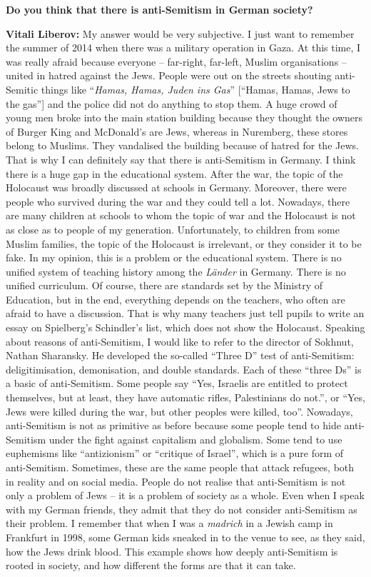 \textbf{Do you think that there is anti-Semitism in German society?} 

\textbf{Vitali Liberov:} My answer would be very subjective. I just want to remember the summer of 2014 when there was a military operation in Gaza. At this time, I was really afraid because everyone – far-right, far-left, Muslim organisations – united in hatred against the Jews. People were out on the streets shouting anti-Semitic things like ``\textit{Hamas, Hamas, Juden ins Gas}'' [``Hamas, Hamas, Jews to the gas''] and the police did not do anything to stop them. A huge crowd of young men broke into the main station building because they thought the owners of Burger King and McDonald’s are Jews, whereas in Nuremberg, these stores belong to Muslims. They vandalised the building because of hatred for the Jews. That is why I can definitely say that there is anti-Semitism in Germany. I think there is a huge gap in the educational system. After the war, the topic of the Holocaust was broadly discussed at schools in Germany. Moreover, there were people who survived during the war and they could tell a lot. Nowadays, there are many children at schools to whom the topic of war and the Holocaust is not as close as to people of my generation. Unfortunately, to children from some Muslim families, the topic of the Holocaust is irrelevant, or they consider it to be fake. In my opinion, this is a problem or the educational system. There is no unified system of teaching history among the \textit{Länder} in Germany. There is no unified curriculum. Of course, there are standards set by the Ministry of Education, but in the end, everything depends on the teachers, who often are afraid to have a discussion. That is why many teachers just tell pupils to write an essay on Spielberg’s Schindler’s list, which does not show the Holocaust. Speaking about reasons of anti-Semitism, I would like to refer to the director of Sokhnut, Nathan Sharansky. He developed the so-called ``Three D'' test of anti-Semitism: deligitimisation, demonisation, and double standards. Each of these ``three Ds'' is a basic of anti-Semitism. Some people say ``Yes, Israelis are entitled to protect themselves, but at least, they have automatic rifles, Palestinians do not.'', or ``Yes, Jews were killed during the war, but other peoples were killed, too''. Nowadays, anti-Semitism is not as primitive as before because some people tend to hide anti-Semitism under the fight against capitalism and globalism. Some tend to use euphemisms like ``antizionism'' or ``critique of Israel'', which is a pure form of anti-Semitism. Sometimes, these are the same people that attack refugees, both in reality and on social media. People do not realise that anti-Semitism is not only a problem of Jews – it is a problem of society as a whole. Even when I speak with my German friends, they admit that they do not consider anti-Semitism as their problem. I remember that when I was a \textit{madrich} in a Jewish camp in Frankfurt in 1998, some German kids sneaked in to the venue to see, as they said, how the Jews drink blood. This example shows how deeply anti-Semitism is rooted in society, and how different the forms are that it can take.  

